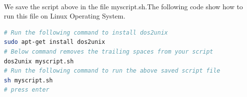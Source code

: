 \paragraph{}
We save the script above in the file \scriptsize{myscript.sh}.\normalsize The following code show how to run this file on Linux Operating System.
\begin{lstlisting}[language=Bash]
# Run the following command to install dos2unix
sudo apt-get install dos2unix
# Below command removes the trailing spaces from your script
dos2unix myscript.sh
# Run the following command to run the above saved script file
sh myscript.sh
# press enter
\end{lstlisting}
